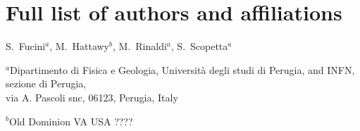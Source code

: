\documentclass[times, twoside]{PosWhiPap}
\begin{document}

\captionsetup*{format=largeformat}
\section{Full list of authors and affiliations} \label{note:Note1} 

S.~Fucini$^a$, M.~Hattawy$^b$, M.~Rinaldi$^a$, S.~Scopetta$^a$  

\begin{center}

{\it

$^a${Dipartimento di Fisica e Geologia, Università degli studi di Perugia, and INFN, sezione di Perugia, \\
via A. Pascoli snc, 06123, Perugia, Italy}

$^b${Old Dominion VA USA ????}
}
\end{center}

\end{document}
